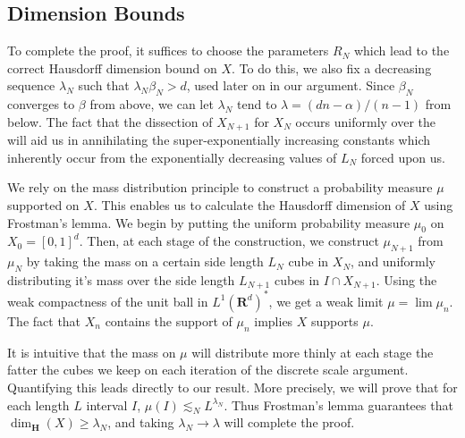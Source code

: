 \documentclass{article}
\theoremstyle{plain}
\theoremstyle{plain}
\begin{document}
\begin{multicols}{2}

\section{Dimension Bounds}

To complete the proof, it suffices to choose the parameters $R_N$ which lead to the correct Hausdorff dimension bound on $X$. To do this, we also fix a decreasing sequence $\lambda_N$ such that $\lambda_N \beta_N > d$, used later on in our argument. Since $\beta_N$ converges to $\beta$ from above, we can let $\lambda_N$ tend to $\lambda = (dn - \alpha)/(n - 1)$ from below. The fact that the dissection of $X_{N+1}$ for $X_N$ occurs uniformly over the will aid us in annihilating the super-exponentially increasing constants which inherently occur from the exponentially decreasing values of $L_N$ forced upon us.

We rely on the mass distribution principle to construct a probability measure $\mu$ supported on $X$. This enables us to calculate the Hausdorff dimension of $X$ using Frostman's lemma. We begin by putting the uniform probability measure $\mu_0$ on $X_0 = [0,1]^d$. Then, at each stage of the construction, we construct $\mu_{N+1}$ from $\mu_N$ by taking the mass on a certain side length $L_N$ cube in $X_N$, and uniformly distributing it's mass over the side length $L_{N+1}$ cubes in $I \cap X_{N+1}$. Using the weak compactness of the unit ball in $L^1(\mathbf{R}^d)^*$, we get a weak limit $\mu = \lim \mu_n$. The fact that $X_n$ contains the support of $\mu_n$ implies $X$ supports $\mu$.

It is intuitive that the mass on $\mu$ will distribute more thinly at each stage the fatter the cubes we keep on each iteration of the discrete scale argument. Quantifying this leads directly to our result. More precisely, we will prove that for each length $L$ interval $I$, $\mu(I) \lesssim_N L^{\lambda_N}$. Thus Frostman's lemma guarantees that $\dim_{\mathbf{H}}(X) \geq \lambda_N$, and taking $\lambda_N \to \lambda$ will complete the proof.


\end{multicols}
\end{document}

